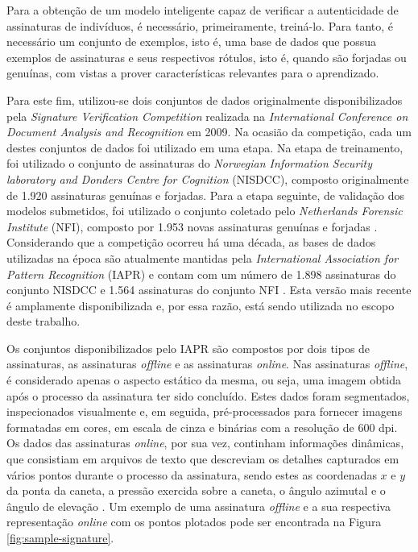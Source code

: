 Para a obtenção de um modelo inteligente capaz de verificar a autenticidade de assinaturas de indivíduos, é necessário, primeiramente, treiná-lo. Para tanto, é necessário um conjunto de exemplos, isto é, uma base de dados  que possua exemplos de assinaturas e seus respectivos rótulos, isto é, quando são forjadas ou genuínas, com vistas a prover características relevantes para o aprendizado.

Para este fim, utilizou-se dois conjuntos de dados originalmente disponibilizados pela
\emph{Signature Verification Competition} realizada na \emph{International Conference on Document Analysis and Recognition} em 2009. Na ocasião da competição, cada um destes conjuntos de dados foi utilizado em uma etapa. Na etapa de treinamento, foi utilizado o conjunto de assinaturas do \emph{Norwegian Information Security laboratory and Donders Centre for Cognition} (NISDCC), composto originalmente de 1.920 assinaturas genuínas e forjadas. Para a etapa seguinte, de validação dos modelos submetidos, foi utilizado o conjunto coletado pelo \emph{Netherlands Forensic Institute} (NFI), composto por 1.953 novas assinaturas genuínas e forjadas \cite{icdar2009}. Considerando que a competição ocorreu há uma década, as bases de dados utilizadas na época são atualmente mantidas pela \emph{International Association for Pattern Recognition} (IAPR) e contam com um número de 1.898 assinaturas do conjunto NISDCC e 1.564 assinaturas do conjunto NFI \cite{iapr-tc11}. Esta versão mais recente é amplamente disponibilizada e, por essa razão, está sendo utilizada no escopo deste trabalho.

Os conjuntos disponibilizados pelo IAPR são compostos por dois tipos de assinaturas, as assinaturas \emph{offline} e as assinaturas \emph{online}. Nas assinaturas \emph{offline}, é considerado apenas o aspecto estático da mesma, ou seja, uma imagem obtida após o processo da assinatura ter sido concluído. Estes dados foram segmentados, inspecionados visualmente e, em seguida, pré-processados para fornecer imagens formatadas em cores, em escala de cinza e binárias com a resolução de $600$ dpi. Os dados das assinaturas \emph{online}, por sua vez, continham informações dinâmicas, que consistiam em arquivos de texto que descreviam os detalhes capturados em vários pontos durante o processo da assinatura, sendo estes as coordenadas $x$ e $y$ da ponta da caneta, a pressão exercida sobre a caneta, o ângulo azimutal e o ângulo de elevação \cite{icdar2009}. Um exemplo de uma assinatura \emph{offline} e a sua respectiva representação \emph{online} com os pontos plotados pode ser encontrada na Figura \ref{fig:sample-signature}.


